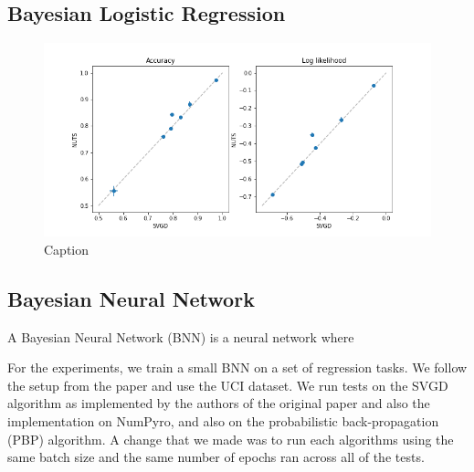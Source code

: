 \subsection{Bayesian Logistic Regression}

\begin{figure}[h]
    \centering
    \includegraphics[width=\textwidth]{figs/logistic_svgd_nuts.png}
    \caption{Caption}
    \label{fig:my_label}
\end{figure}

\subsection{Bayesian Neural Network}

A Bayesian Neural Network (BNN) is a neural network where 

For the experiments, we train a small BNN on a set of regression tasks. We follow the setup from the paper and use the UCI dataset. We run tests on the SVGD algorithm as implemented by the authors of the original paper and also the implementation on NumPyro, and also on the probabilistic back-propagation (PBP) algorithm. A change that we made was to run each algorithms using the same batch size and the same number of epochs ran across all of the tests.

